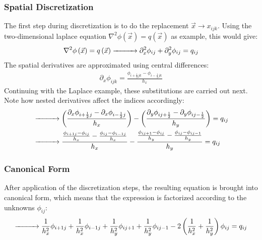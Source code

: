 \subsubsection*{Spatial Discretization}
The first step during discretization is to do the replacement $\vec{x}\rightarrow x_{ijk}$. Using the two-dimensional laplace equation $\nabla^2\phi(\vec{x})=q(\vec{x})$ as example, this would give:
\begin{align*}
\nabla^2\phi\left(\vec{x}\right)=q\left(\vec{x}\right)
\xrightarrow{\makebox[1cm]{}}
\partial_x^2\phi_{ij}+
\partial_y^2\phi_{ij}
=
q_{ij}
\end{align*}
The spatial derivatives are approximated using central differences:
\begin{align}
\partial_x\phi_{ijk} = \frac{\phi_{i+\frac{1}{2}jk} - \phi_{i-\frac{1}{2}jk}}{h_x}
\label{eq:pn_solver_central_difference}
\end{align}
Continuing with the Laplace example, these substitutions are carried out next. Note how nested derivatives affect the indices accordingly:
\begin{align*}
&
\xrightarrow{\makebox[1cm]{}}
\left(
\frac
{
\partial_x
\phi_{i+\frac{1}{2}j}
-
\partial_x
\phi_{i-\frac{1}{2}j}
}
{h_x}
\right)
-
\left(
\frac
{
\partial_y
\phi_{ij+\frac{1}{2}}
-
\partial_y
\phi_{ij-\frac{1}{2}}
}
{h_y}
\right)
=
q_{ij}
\\
&
\xrightarrow{\makebox[1cm]{}}
\frac
{
\frac{\phi_{i+1j} - \phi_{ij}}{h_x}
-
\frac{\phi_{ij} - \phi_{i-1j}}{h_x}
}
{h_x}
-
\frac
{
\frac{\phi_{ij+1} - \phi_{ij}}{h_y}
-
\frac{\phi_{ij} - \phi_{ij-1}}{h_y}
}
{h_y}
=
q_{ij}
\end{align*}

\subsubsection*{Canonical Form}
After application of the discretization steps, the resulting equation is brought into canonical form, which means that the expression is factorized according to the unknowns $\phi_{ij}$:
\begin{align}
\xrightarrow{\makebox[1cm]{}}
\frac{1}{h_x^2}\phi_{i+1j}
+\frac{1}{h_x^2}\phi_{i-1j}
+\frac{1}{h_y^2}\phi_{ij+1}
+\frac{1}{h_y^2}\phi_{ij-1}
-2\left(\frac{1}{h_x^2}+\frac{1}{h_y^2}\right)\phi_{ij}
=
q_{ij}
\label{eq:pn_laplace_canonical_form}
\end{align}
